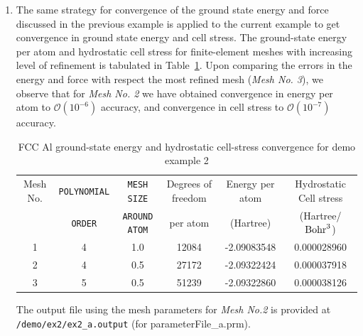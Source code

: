 \begin{enumerate}
\item The same strategy for convergence of the ground state energy and force discussed
in the previous example is applied to the current example to get convergence in ground state energy and cell stress. 
The ground-state energy per atom and hydrostatic cell stress for finite-element meshes with increasing level of refinement is tabulated in Table~\ref{tab:table2}. Upon comparing the errors in the energy and force with respect the most refined mesh (\emph{Mesh No. 3}), we observe that for \emph{Mesh No. 2} we have obtained convergence in energy per atom to $\mathcal{O}(10^{-6})$ accuracy, and convergence in cell stress to $\mathcal{O}(10^{-7})$ accuracy.
\begin{table}[h!]
  \begin{center}
\small	  
    \caption{FCC Al ground-state energy and hydrostatic cell-stress convergence for demo example 2}
    \label{tab:table2}
    \begin{tabular}{c|c|c|c|c|c} 
	    \hline\hline
	    Mesh No. &\verb|POLYNOMIAL| &\verb|MESH SIZE| & Degrees of freedom& Energy per atom & Hydrostatic Cell stress\\
	    &\verb|ORDER| &\verb|AROUND ATOM| & per atom  & (Hartree) & (Hartree/${\rm Bohr}^3$) \\
      \hline
	    1& 4 & 1.0 & 12084 & -2.09083548 &  0.000028960\\	    
	    2& 4 & 0.5 & 27172 & -2.09322424 &  0.000037918\\
	    3&5 & 0.5 & 51239 &  -2.09322860 &  0.000038126\\
       \hline\hline
    \end{tabular}
  \end{center}
\end{table}
The output file using the mesh parameters for \emph{Mesh No.2} is provided at \verb|/demo/ex2/ex2_a.output| (for parameterFile\_a.prm).


\end{enumerate}
